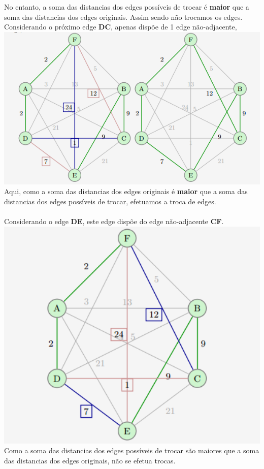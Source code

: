 \documentclass[12pt,a4paper,portrait]{article}
\begin{document}
			No entanto, a soma das distancias dos edges possíveis de trocar é \textbf{maior} que a soma das distancias dos edges originais. Assim sendo não trocamos os edges.\\
			\newpage
			Considerando o próximo edge \textbf{DC}, apenas dispõe de 1 edge não-adjacente,
			\includegraphics[width=1.0\textwidth]{imagens/3}
			Aqui, como a soma das distancias dos edges originais é \textbf{maior} que a soma das distancias dos edges possíveis de trocar, efetuamos a troca de edges.\\\\
			\newpage
			Considerando o edge \textbf{DE}, este edge dispõe do edge não-adjacente \textbf{CF}.\\
			\includegraphics[width=1.0\textwidth]{imagens/4}
			Como a soma das distancias dos edges possíveis de trocar são maiores que a soma das distancias dos edges originais, não se efetua trocas.\\\\
\end{document}
